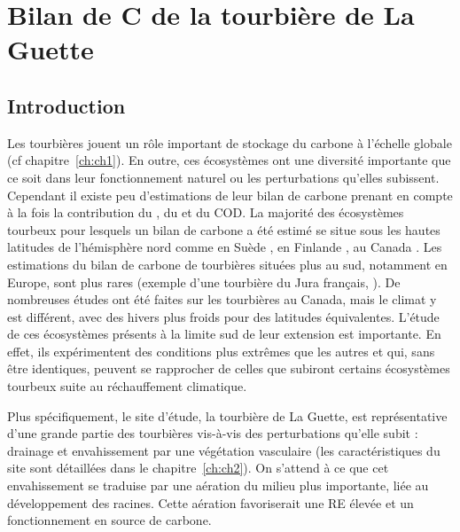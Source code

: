 \singlespacing
\chapter{Bilan de C de la tourbière de La Guette}
\label{ch:ch3}

\minitoc

\newpage
\doublespacing
\section{Introduction}
Les tourbières jouent un rôle important de stockage du carbone à l'échelle globale (cf chapitre~\ref{ch:ch1}).
En outre, ces écosystèmes ont une diversité importante que ce soit dans leur fonctionnement naturel ou les perturbations qu'elles subissent.
Cependant il existe peu d'estimations de leur bilan de carbone prenant en compte à la fois la contribution du \coo, du \chh et du COD.
La majorité des écosystèmes tourbeux pour lesquels un bilan de carbone a été estimé se situe sous les hautes latitudes de l'hémisphère nord comme en Suède \citep{waddington2000,peichl2014}, en Finlande \citep{Alm1997}, au Canada \citep{trudeau2014}.
Les estimations du bilan de carbone de tourbières situées plus au sud, notamment en Europe, sont plus rares (exemple d'une tourbière du Jura français, \citealp{bortoluzzi2006a}). 
De nombreuses études ont été faites sur les tourbières au Canada, mais le climat y est différent, avec des hivers plus froids pour des latitudes équivalentes.
L'étude de ces écosystèmes présents à la limite sud de leur extension est importante.
En effet, ils expérimentent des conditions plus extrêmes que les autres et qui, sans être identiques, peuvent se rapprocher de celles que subiront certains écosystèmes tourbeux suite au réchauffement climatique.

Plus spécifiquement, le site d'étude, la tourbière de La Guette, est représentative d'une grande partie des tourbières vis-à-vis des perturbations qu'elle subit : drainage et envahissement par une végétation vasculaire (les caractéristiques du site sont détaillées dans le chapitre~\ref{ch:ch2}).
On s'attend à ce que cet envahissement se traduise par une aération du milieu plus importante, liée au développement des racines.
Cette aération favoriserait une RE élevée et un fonctionnement en source de carbone.

